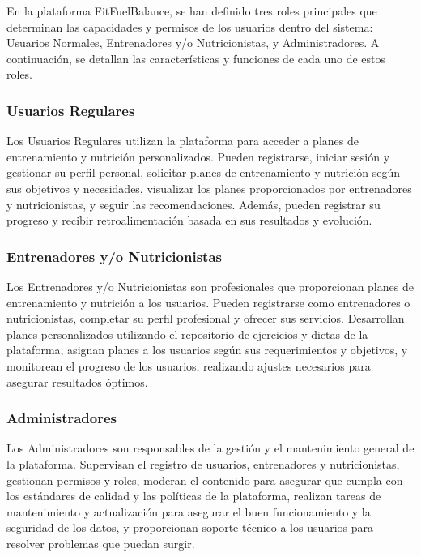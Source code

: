 En la plataforma FitFuelBalance, se han definido tres roles principales que determinan las capacidades y permisos de los usuarios dentro del sistema: Usuarios Normales, Entrenadores y/o Nutricionistas, y Administradores. A continuación, se detallan las características y funciones de cada uno de estos roles.

\subsubsection{Usuarios Regulares}

Los Usuarios Regulares utilizan la plataforma para acceder a planes de entrenamiento y nutrición personalizados. Pueden registrarse, iniciar sesión y gestionar su perfil personal, solicitar planes de entrenamiento y nutrición según sus objetivos y necesidades, visualizar los planes proporcionados por entrenadores y nutricionistas, y seguir las recomendaciones. Además, pueden registrar su progreso y recibir retroalimentación basada en sus resultados y evolución.

\subsubsection{Entrenadores y/o Nutricionistas}

Los Entrenadores y/o Nutricionistas son profesionales que proporcionan planes de entrenamiento y nutrición a los usuarios. Pueden registrarse como entrenadores o nutricionistas, completar su perfil profesional y ofrecer sus servicios. Desarrollan planes personalizados utilizando el repositorio de ejercicios y dietas de la plataforma, asignan planes a los usuarios según sus requerimientos y objetivos, y monitorean el progreso de los usuarios, realizando ajustes necesarios para asegurar resultados óptimos.

\subsubsection{Administradores}

Los Administradores son responsables de la gestión y el mantenimiento general de la plataforma. Supervisan el registro de usuarios, entrenadores y nutricionistas, gestionan permisos y roles, moderan el contenido para asegurar que cumpla con los estándares de calidad y las políticas de la plataforma, realizan tareas de mantenimiento y actualización para asegurar el buen funcionamiento y la seguridad de los datos, y proporcionan soporte técnico a los usuarios para resolver problemas que puedan surgir.
